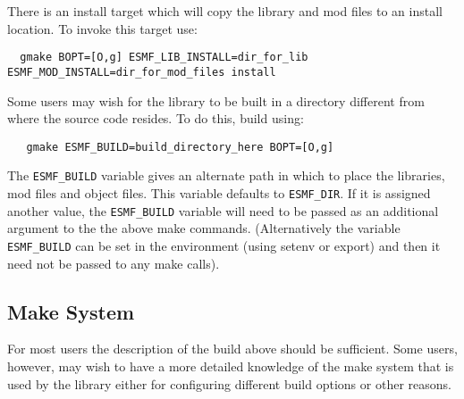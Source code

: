 There is an install target which will copy the library and mod files to an
install location.  To invoke this target use:
\begin{verbatim}
  gmake BOPT=[O,g] ESMF_LIB_INSTALL=dir_for_lib ESMF_MOD_INSTALL=dir_for_mod_files install 
\end{verbatim}

Some users may wish for the library to be built in a directory different from 
where the source code resides.  To do this, build using:
\begin{verbatim}
   gmake ESMF_BUILD=build_directory_here BOPT=[O,g]
\end{verbatim}

The {\tt ESMF\_BUILD} variable gives an alternate path in which to place the libraries,
mod files and object files.  This variable defaults to {\tt ESMF\_DIR}.  If it is 
assigned another value, the {\tt ESMF\_BUILD} variable will need to be passed as
an additional argument to the the above make commands.  (Alternatively the variable
{\tt ESMF\_BUILD} can be set in the environment (using setenv or export) and then it 
need not be passed to any make calls).

%
%
\subsection{Make System}
For most users the description of the build above should be sufficient.  Some
users, however, may wish to have a more detailed knowledge of the make system
that is used by the library either for configuring different build options or
other reasons.
